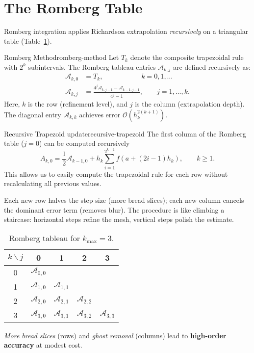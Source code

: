 \section{The Romberg Table}
Romberg integration applies Richardson extrapolation \emph{recursively} on a triangular table (Table~\ref{tab:romberg}).

\begin{definition}{Romberg Method}{romberg-method}
  Let $T_k$ denote the composite trapezoidal rule with $2^k$ subintervals. The Romberg tableau entries $\mathcal{A}_{k,j}$ are defined recursively as:
    \begin{align}
      \mathcal{A}_{k,0} & = T_k, \qquad\qquad\quad\;\; k = 0, 1, \dots \\[1ex]
      \mathcal{A}_{k,j} & = \frac{4^{j} \mathcal{A}_{k,j-1} - \mathcal{A}_{k-1,j-1}}{4^{j} - 1}, \qquad j = 1, \dots, k.
    \end{align}
  Here, $k$ is the row (refinement level), and $j$ is the column (extrapolation depth). The diagonal entry $\mathcal{A}_{k,k}$ achieves error $\mathcal{O}(h_k^{2(k+1)})$.
\end{definition}
\begin{corollary}{Recursive Trapezoid update}{recursive-trapezoid}
  The first column of the Romberg table ($j=0$) can be computed recursively
  \[
    A_{k,0} = \frac12 \mathcal{A}_{k-1,0} + h_k \sum_{i=1}^{2^{k-1}}f\left(a + (2i-1)h_k\right), \qquad k \ge 1.
  \]
  This allows us to easily compute the trapezoidal rule for each row without recalculating all previous values.
\end{corollary}

Each new row halves the step size (more bread slices); each new column cancels the dominant error term (removes blur). The procedure is like climbing a staircase: horizontal steps refine the mesh, vertical steps polish the estimate.

\begin{table}[h]
  \centering
  \caption{Romberg tableau for $k_{\max}=3$.}
  \label{tab:romberg}
  \begin{tabular}{c|cccc}
    $k\backslash j$ & 0                   & 1                   & 2                   & 3                   \\ \hline
    0               & $\mathcal{A}_{0,0}$                                                                   \\
    1               & $\mathcal{A}_{1,0}$ & $\mathcal{A}_{1,1}$                                             \\
    2               & $\mathcal{A}_{2,0}$ & $\mathcal{A}_{2,1}$ & $\mathcal{A}_{2,2}$                       \\
    3               & $\mathcal{A}_{3,0}$ & $\mathcal{A}_{3,1}$ & $\mathcal{A}_{3,2}$ & $\mathcal{A}_{3,3}$ \\
  \end{tabular}
\end{table}
\emph{More bread slices} (rows) and \emph{ghost removal} (columns) lead to \textbf{high-order accuracy} at modest cost.

